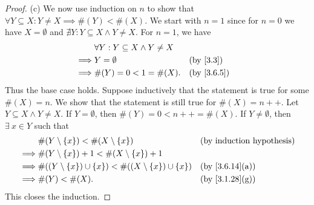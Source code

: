 \begin{proof}{(c)}
  We now use induction on \(n\) to show that \(\forall Y \subseteq X : Y \neq X \implies \#(Y) < \#(X)\).
  We start with \(n = 1\) since for \(n = 0\) we have \(X = \emptyset\) and \(\nexists Y : Y \subseteq X \land Y \neq X\).
  For \(n = 1\), we have
  \begin{align*}
             & \forall Y : Y \subseteq X \land Y \neq X                             \\
    \implies & Y = \emptyset                            &  & \text{(by \cref{3.3})} \\
    \implies & \#(Y) = 0 < 1 = \#(X).                   &  & \by{3.6.5}
  \end{align*}
  Thus the base case holds.
  Suppose inductively that the statement is true for some \(\#(X) = n\).
  We show that the statement is still true for \(\#(X) = n++\).
  Let \(Y \subseteq X \land Y \neq X\).
  If \(Y = \emptyset\), then \(\#(Y) = 0 < n++ = \#(X)\).
  If \(Y \neq \emptyset\), then \(\exists\ x \in Y\) such that
  \begin{align*}
             & \#(Y \setminus \{x\}) < \#(X \setminus \{x\})                           &  & \byIH                        \\
    \implies & \#(Y \setminus \{x\}) + 1 < \#(X \setminus \{x\}) + 1                                                     \\
    \implies & \#((Y \setminus \{x\}) \cup \{x\}) < \#((X \setminus \{x\}) \cup \{x\}) &  & \text{(by \cref{3.6.14}(a))} \\
    \implies & \#(Y) < \#(X).                                                          &  & \text{(by \cref{3.1.28}(g))}
  \end{align*}
  This closes the induction.
\end{proof}


